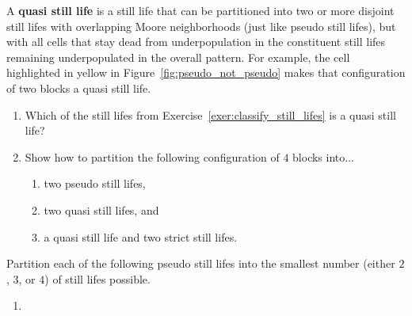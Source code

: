 \begin{multicols}{2}
	
	\mfilbreak
	
	
	\begin{problem}\label{exer:quasi_still_life} 
		A \textbf{quasi still life} is a still life that can be partitioned into two or more disjoint still lifes with overlapping Moore neighborhoods (just like pseudo still lifes), but with all cells that stay dead from underpopulation in the constituent still lifes remaining underpopulated in the overall pattern. For example, the cell highlighted in yellow in Figure~\ref{fig:pseudo_not_pseudo} makes that configuration of two blocks a quasi still life.\smallskip
		
		\begin{enumerate}[label=\bf\color{ocre}(\alph*)]
			\item Which of the still lifes from Exercise~\ref{exer:classify_still_lifes} is a quasi still life?
			
			\item Show how to partition the following configuration of $4$ blocks into...
			
			\begin{center}
			\end{center}
			
			\begin{enumerate}[label=\bf\color{ocre}(\roman*)]
				\item two pseudo still lifes,
				
				\item two quasi still lifes, and
				
				\item a quasi still life and two strict still lifes.
			\end{enumerate}
		\end{enumerate}
	\end{problem}
	
	
	\mfilbreak
	
	
	\begin{problemstar}\label{exer:pseudo_few_colors} 
		Partition each of the following pseudo still lifes into the smallest number (either $2$, $3$, or $4$) of still lifes possible.\setlength{\columnsep}{0pt}\vspace*{-0.25cm}
		
		\begin{multicols}{2}
			\begin{enumerate}[label=(\alph*),series=exer_pseudo]
				\item[\bf\color{ocre}(a)] 
				

\end{enumerate}
\end{multicols}
\end{problemstar}
\end{multicols}
